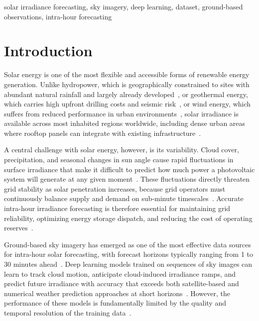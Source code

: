 \documentclass[twoside,11pt]{article}
\begin{document}
\begin{keywords}
  solar irradiance forecasting, sky imagery, deep learning, dataset, ground-based observations, intra-hour forecasting
\end{keywords}

\section{Introduction}
\label{sec:intro}

Solar energy is one of the most flexible and accessible forms of renewable energy generation. Unlike hydropower, which is geographically constrained to sites with abundant natural rainfall and largely already developed~\citep{kroposki2017achieving}, or geothermal energy, which carries high upfront drilling costs and seismic risk~\citep{boretti2025geothermal}, or wind energy, which suffers from reduced performance in urban environments~\citep{reja2022wind}, solar irradiance is available across most inhabited regions worldwide, including dense urban areas where rooftop panels can integrate with existing infrastructure~\citep{pravaalie2019solar}.

A central challenge with solar energy, however, is its variability. Cloud cover, precipitation, and seasonal changes in sun angle cause rapid fluctuations in surface irradiance that make it difficult to predict how much power a photovoltaic system will generate at any given moment~\citep{antonanzas2016review, hendrikx2024allsky}. These fluctuations directly threaten grid stability as solar penetration increases, because grid operators must continuously balance supply and demand on sub-minute timescales~\citep{lappalainen2020output}. Accurate intra-hour irradiance forecasting is therefore essential for maintaining grid reliability, optimizing energy storage dispatch, and reducing the cost of operating reserves~\citep{yang2022review}.

Ground-based sky imagery has emerged as one of the most effective data sources for intra-hour solar forecasting, with forecast horizons typically ranging from 1 to 30 minutes ahead~\citep{paletta2023advances}. Deep learning models trained on sequences of sky images can learn to track cloud motion, anticipate cloud-induced irradiance ramps, and predict future irradiance with accuracy that exceeds both satellite-based and numerical weather prediction approaches at short horizons~\citep{paletta2022eclipse, nie2024skygpt, siddiqui2019deep}. However, the performance of these models is fundamentally limited by the quality and temporal resolution of the training data~\citep{siddiqui2019deep}.
\end{document}

